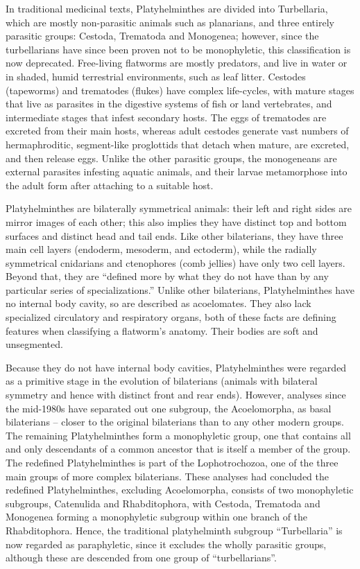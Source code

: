 In traditional medicinal texts, Platyhelminthes are divided into Turbellaria, which are mostly non-parasitic animals such as planarians, and three entirely parasitic groups: Cestoda, Trematoda and Monogenea; however, since the turbellarians have since been proven not to be monophyletic, this classification is now deprecated. Free-living flatworms are mostly predators, and live in water or in shaded, humid terrestrial environments, such as leaf litter. Cestodes (tapeworms) and trematodes (flukes) have complex life-cycles, with mature stages that live as parasites in the digestive systems of fish or land vertebrates, and intermediate stages that infest secondary hosts. The eggs of trematodes are excreted from their main hosts, whereas adult cestodes generate vast numbers of hermaphroditic, segment-like proglottids that detach when mature, are excreted, and then release eggs. Unlike the other parasitic groups, the monogeneans are external parasites infesting aquatic animals, and their larvae metamorphose into the adult form after attaching to a suitable host.

Platyhelminthes are bilaterally symmetrical animals: their left and right sides are mirror images of each other; this also implies they have distinct top and bottom surfaces and distinct head and tail ends. Like other bilaterians, they have three main cell layers (endoderm, mesoderm, and ectoderm), while the radially symmetrical cnidarians and ctenophores (comb jellies) have only two cell layers. Beyond that, they are ``defined more by what they do not have than by any particular series of specializations.'' Unlike other bilaterians, Platyhelminthes have no internal body cavity, so are described as acoelomates. They also lack specialized circulatory and respiratory organs, both of these facts are defining features when classifying a flatworm's anatomy. Their bodies are soft and unsegmented.

Because they do not have internal body cavities, Platyhelminthes were regarded as a primitive stage in the evolution of bilaterians (animals with bilateral symmetry and hence with distinct front and rear ends). However, analyses since the mid-1980s have separated out one subgroup, the Acoelomorpha, as basal bilaterians -- closer to the original bilaterians than to any other modern groups. The remaining Platyhelminthes form a monophyletic group, one that contains all and only descendants of a common ancestor that is itself a member of the group. The redefined Platyhelminthes is part of the Lophotrochozoa, one of the three main groups of more complex bilaterians. These analyses had concluded the redefined Platyhelminthes, excluding Acoelomorpha, consists of two monophyletic subgroups, Catenulida and Rhabditophora, with Cestoda, Trematoda and Monogenea forming a monophyletic subgroup within one branch of the Rhabditophora. Hence, the traditional platyhelminth subgroup ``Turbellaria'' is now regarded as paraphyletic, since it excludes the wholly parasitic groups, although these are descended from one group of ``turbellarians''.

